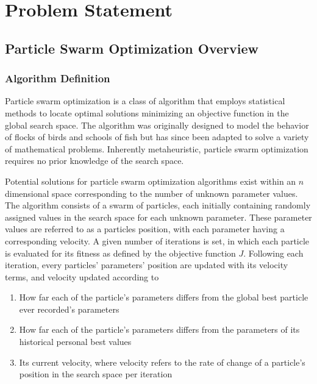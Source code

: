 \chapter{Problem Statement}

\section{Particle Swarm Optimization Overview}

\subsection{Algorithm Definition}
\noindent Particle swarm optimization is a class of algorithm that employs statistical methods to locate optimal solutions 
minimizing an objective function in the global search space. The algorithm was originally designed to model
the behavior of flocks of birds and schools of fish but has since been adapted to solve a variety of mathematical problems.
Inherently metaheuristic, particle swarm optimization requires no
prior knowledge of the search space. \newline

\noindent Potential solutions for particle swarm optimization algorithms exist within an $n$ dimensional space corresponding to the number of unknown parameter values. 
The algorithm consists of a swarm of particles, each initially containing randomly assigned values in the search space for each unknown
parameter. These parameter values are referred to as a particles position, with each parameter having a corresponding velocity. A given number of iterations is set, in which
each particle is evaluated for its fitness as defined by the objective function $J$. Following each iteration, every particles' parameters' position are updated with its velocity terms,
and velocity updated according to
\begin{enumerate}
    \item How far each of the particle's parameters differs from the global best particle ever recorded's parameters
    \item How far each of the particle's parameters differs from the parameters of its historical personal best values
    \item Its current velocity, where velocity refers to the rate of change of a particle's position in the search space per iteration
\end{enumerate}

